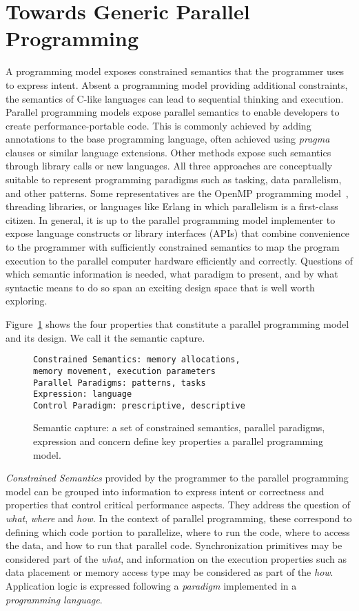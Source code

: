 \section{Towards Generic Parallel Programming}\label{chap:background}

A programming model exposes constrained semantics that the programmer uses to express intent. Absent a programming model providing additional constraints, the semantics of C-like languages can lead to sequential thinking and execution. Parallel programming models expose parallel semantics to enable developers to create performance-portable code. This is commonly achieved by adding annotations to the base programming language, often achieved using \emph{pragma} clauses or similar language extensions. Other methods expose such semantics through library calls or new languages. All three approaches are conceptually suitable to represent programming paradigms such as tasking, data parallelism, and other patterns. Some representatives are the OpenMP programming model~\cite{OPENMP}, threading libraries, or languages like Erlang\cite{ERLANG} in which parallelism is a first-class citizen. In general, it is up to the parallel programming model implementer to expose language constructs or library interfaces (APIs) that combine convenience to the programmer with sufficiently constrained semantics to map the program execution to the parallel computer hardware efficiently and correctly. Questions of which semantic information is needed, what paradigm to present, and by what syntactic means to do so span an exciting design space that is well worth exploring.

 Figure~\ref{figSemCapture} shows the four properties that constitute a parallel programming model and its design. We call it the semantic capture.

\begin{figure}[h]
\begin{Verbatim}[frame=leftline]
Constrained Semantics: memory allocations, 
memory movement, execution parameters
Parallel Paradigms: patterns, tasks
Expression: language 
Control Paradigm: prescriptive, descriptive
\end{Verbatim}
\caption{Semantic capture: a set of constrained semantics, parallel paradigms, expression and concern define key properties a parallel programming model.}
\label{figSemCapture}
\end{figure}

\emph{Constrained Semantics} provided by the programmer to the parallel programming model can be grouped into information to express intent or correctness and properties that control critical performance aspects. They address the question of \emph{what}, \emph{where} and \emph{how}. In the context of parallel programming, these correspond to defining which code portion to parallelize, where to run the code, where to access the data, and how to run that parallel code. Synchronization primitives may be considered part of the \emph{what}, and information on the execution properties such as data placement or memory access type may be considered as part of the \emph{how}. Application logic is expressed following a \emph{paradigm} implemented in a \emph{programming language}.

